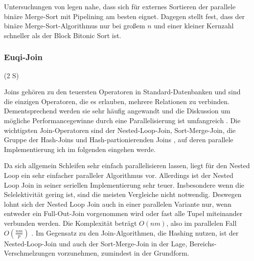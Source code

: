 \documentclass[a4paper,12pt,twoside]{article}
\begin{document}
Untersuchungen von {\textcite{Bitton1984}} legen nahe, dass sich für externes Sortieren der parallele binäre Merge-Sort mit Pipelining am besten eignet. Dagegen stellt {\textcite{Menon1986}} fest, dass der binäre Merge-Sort-Algorithmus nur bei großem $n$ und einer kleiner Kernzahl schneller als der Block Bitonic Sort ist.

\subsubsection{Euqi-Join} (2 S)
\label{Equi Join} 

Joins gehören zu den teuersten Operatoren in Standard-Datenbanken und sind die einzigen Operatoren, die es erlauben, mehrere Relationen zu verbinden. Dementsprechend werden sie sehr häufig angewandt und die Diskussion um mögliche Performancegewinne durch eine Parallelisierung ist umfangreich {\autocite{Richardson1987, Valduriez1984, Schneider1989, DeWitt1985, Lu1994}}. Die wichtigsten Join-Operatoren sind der Nested-Loop-Join, Sort-Merge-Join, die Gruppe der Hash-Joins und Hash-partionierenden Joins {\autocite{Mishra1992, Lu1994}}, auf deren parallele Implementierung ich im folgenden eingehen werde.

Da sich allgemein Schleifen sehr einfach parallelisieren lassen, liegt für den Nested Loop ein sehr einfacher paralleler Algorithmus vor. Allerdings ist der Nested Loop Join in seiner seriellen Implementierung sehr teuer. Insbesondere wenn die Selelektivität gering ist, sind die meisten Vergleiche nicht notwendig. Deswegen lohnt sich der Nested Loop Join auch in einer parallelen Variante nur, wenn entweder ein Full-Out-Join vorgenommen wird oder fast alle Tupel miteinander verbunden werden. Die Komplexität beträgt $ O(n m) $, also im parallelen Fall $ O( \frac {n m} {p} )$ {\autocite[S. 72]{Mishra1992}}. Im Gegensatz zu den Join-Algorithmen, die Hashing nutzen, ist der Nested-Loop-Join und auch der Sort-Merge-Join in der Lage, Bereichs-Verschmelzungen vorzunehmen, zumindest in der Grundform. 
\end{document}
